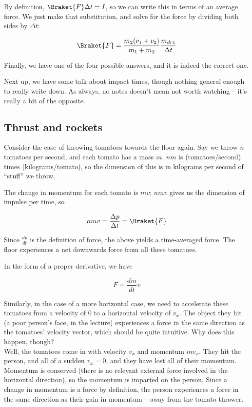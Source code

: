 By definition, $\Braket{F} \Delta t = I$, so we can write this in terms of an average force. We just make that substitution, and solve for the force by dividing both sides by $\Delta t$:

\begin{equation}
\Braket{F} = \frac{m_2(v_1 + v_2)}{m_1 + m_2} \frac{m_{dr1}}{\Delta t}
\end{equation}

Finally, we have one of the four possible answers, and it is indeed the correct one.

Next up, we have some talk about impact times, though nothing general enough to really write down. As always, no notes doesn't mean not worth watching -- it's really a bit of the opposite.

\subsection{Thrust and rockets}

Consider the case of throwing tomatoes towards the floor again. Say we throw $n$ tomatoes per second, and each tomato has a mass $m$. $n m$ is (tomatoes/second) times (kilograms/tomato), so the dimension of this is in kilograms per second of ``stuff'' we throw.

The change in momentum for each tomato is $m v$; $n m v$ gives us the dimension of impulse per time, so

\begin{equation}
n m v = \frac{\Delta p}{\Delta t} = \Braket{F}
\end{equation}

Since $\displaystyle \frac{dp}{dt}$ is the definition of force, the above yields a time-averaged force. The floor experiences a net downwards force from all these tomatoes.

In the form of a proper derivative, we have

\begin{equation}
F = \frac{dm}{dt} v
\end{equation}

Similarly, in the case of a more horizontal case, we need to accelerate these tomatoes from a velocity of 0 to a horizontal velocity of $v_x$. The object they hit (a poor person's face, in the lecture) experiences a force in the same direction as the tomatoes' velocity vector, which should be quite intuitive. Why does this happen, though?\\
Well, the tomatoes come in with velocity $v_x$ and momentum $m v_x$. They hit the person, and all of a sudden $v_x = 0$, and they have lost all of their momentum. Momentum is conserved (there is no relevant external force involved in the horizontal direction), so the momentum is imparted on the person. Since a change in momentum is a force by definition, the person experiences a force in the same direction as their gain in momentum -- away from the tomato thrower.

